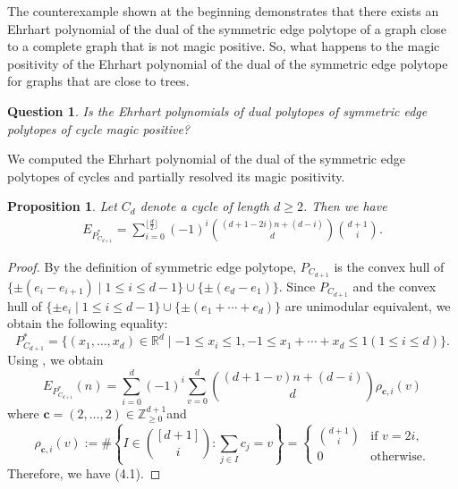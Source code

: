 \documentclass[a4paper,reqno,11pt, oneside]{amsart}
\newcommand{\ZZ}{\mathbb{Z}}
\newcommand{\RR}{\mathbb{R}}
\newtheorem{prop}[thm]{Proposition}
\newtheorem{q}[thm]{Question}
\theoremstyle{definition}
\theoremstyle{remark}
\begin{document}
The counterexample shown at the beginning demonstrates that there exists an Ehrhart polynomial of the dual of the symmetric edge polytope of a graph close to a complete graph that is not magic positive. So, what happens to the magic positivity of the Ehrhart polynomial of the dual of the symmetric edge polytope for graphs that are close to trees.

\begin{q}
Is the Ehrhart polynomials of dual polytopes of symmetric edge polytopes of cycle magic positive?
\end{q}
We computed the Ehrhart polynomial of the dual of the symmetric edge polytopes of cycles and partially resolved its magic positivity.
\begin{prop}
Let $C_d$ denote a cycle of length $d \geq 2$. Then we have
\begin{align}
  E_{P_{C_{d+1}}^\ast} = \sum_{i=0}^{\lfloor \frac{d}{2} \rfloor} (-1)^i\binom{(d+1-2i)n + (d-i)}{d}\binom{d+1}{i}.
\end{align}
\end{prop}
\begin{proof}
By the definition of symmetric edge polytope, $P_{C_{d+1}}$ is the convex hull of $\{\pm(e_i-e_{i+1}) \mid 1 \leq i \leq d-1\} \cup \{\pm(e_d-e_1)\}$. Since $P_{C_{d+1}}$ and the convex hull of $\{\pm e_i \mid 1 \leq i \leq d-1\} \cup \{\pm (e_1 + \cdots + e_d)\}$ are unimodular equivalent, we obtain the following equality:
$$P_{C_{d+1}}^\ast = \{(x_1, \ldots, x_d) \in \RR^d \mid -1 \leq x_i \leq 1, -1 \leq x_1 + \cdots + x_d \leq 1 (1 \leq i \leq d)\}.$$
Using \cite[Proposition 2.2 and Theorem 2.5]{FM}, we obtain 
$$E_{P_{C_{d+1}}^\ast}(n) = \sum_{i=0}^{d}(-1)^i\sum_{v=0}^{d}\binom{(d+1-v)n+(d-i)}{d}\rho_{\mathbf{c}, i}(v)$$
where $\mathbf{c} = (2, \ldots, 2) \in \ZZ_{\geq 0}^{d+1}$and
$$\rho_{\mathbf{c},i}(v) := \#\left\{ I\in \binom{[d+1]}{i} : \sum_{j \in I} c_j = v\right\}=\begin{cases}
\binom{d+1}{i} &\text{if $v = 2i$}, \\
0 &\text{otherwise}. 
\end{cases}
$$
Therefore, we have (4.1).
\end{proof}
\end{document}
